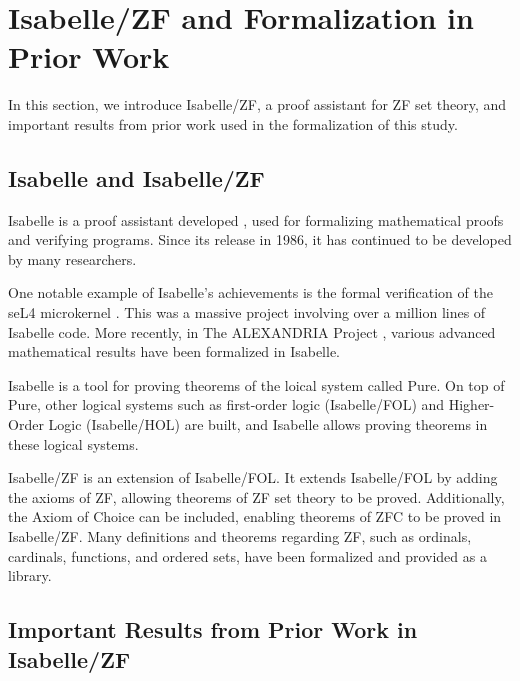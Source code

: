 \documentclass{report}
\begin{document}
\section{Isabelle/ZF and Formalization in Prior Work}
In this section, we introduce Isabelle/ZF, a proof assistant for ZF set theory, 
and important results from prior work used in the formalization of this study.


\subsection{Isabelle and Isabelle/ZF}
Isabelle is a proof assistant developed \cite{paulson_1986}, used for formalizing mathematical proofs and verifying programs. 
Since its release in 1986, it has continued to be developed by many researchers.

One notable example of Isabelle's achievements is the formal verification of the seL4 microkernel \cite{seL4}.
This was a massive project involving over a million lines of Isabelle code. 
More recently, in The ALEXANDRIA Project \cite{alexiandria}, various advanced mathematical results have been formalized in Isabelle.

Isabelle is a tool for proving theorems of the loical system called Pure. 
On top of Pure, other logical systems such as first-order logic (Isabelle/FOL) and Higher-Order Logic (Isabelle/HOL) are built,
and Isabelle allows proving theorems in these logical systems.

Isabelle/ZF is an extension of Isabelle/FOL.
It extends Isabelle/FOL by adding the axioms of ZF, allowing theorems of ZF set theory to be proved.
Additionally, the Axiom of Choice can be included, enabling theorems of ZFC to be proved in Isabelle/ZF.
Many definitions and theorems regarding ZF, such as ordinals, cardinals, functions, and ordered sets, 
have been formalized and provided as a library.


\subsection{Important Results from Prior Work in Isabelle/ZF}
\end{document}
